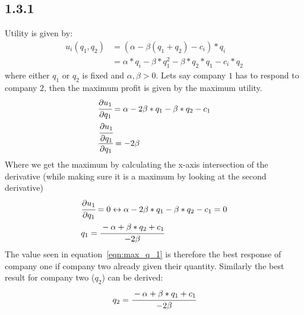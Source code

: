 \documentclass[11pt]{article}
\begin{document}
\subsection*{1.3.1}
Utility is given by:
\begin{equation}
    \begin{split}
        u_i(q_1,q_2)&=(\alpha -\beta(q_1+q_2) - c_i)*q_i\\
                    &=\alpha*q_i -\beta*q_1^2 -\beta*q_2*q_1 - c_i*q_2
    \end{split}        
\end{equation}
where either $q_1$ or $q_2$ is fixed and $\alpha, \beta>0$.
Lets say company $1$ has to respond to company $2$, then the maximum profit is given by the maximum utility.
\begin{align}
    & \cfrac{\partial u_1}{\partial q_1}=\alpha - 2\beta*q_1 - \beta*q_2 - c_1\\
    & \cfrac{\cfrac{\partial u_1}{\partial q_1}}{\partial q_1}=-2\beta
\end{align}
Where we get the maximum by calculating the x-axis intersection of the derivative (while making sure it is a maximum by
looking at the second derivative)
\begin{align}
    &\cfrac{\partial u_1}{\partial q_1}=0 \leftrightarrow \alpha - 2\beta*q_1 - \beta*q_2 - c_1=0\\
    & q_1 = \cfrac{-\alpha+\beta*q_2 + c_1}{-2\beta}
    \label{eqn:max_q_1}
\end{align}
The value seen in equation~\ref{eqn:max_q_1} is therefore the best response of company one if company two already
given their quantity. Similarly the best result for company two ($q_2$) can be derived:
\begin{equation*}
    q_2 = \cfrac{-\alpha+\beta*q_1 + c_1}{-2\beta}
\end{equation*}
\end{document}
